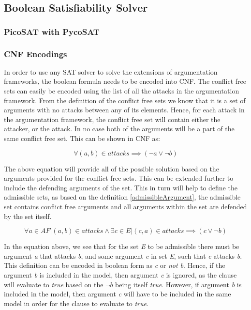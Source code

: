 \subsection{Boolean Satisfiability Solver} \label{section:satSolver}


\subsubsection{PicoSAT with PycoSAT}



\subsubsection{CNF Encodings}
In order to use any SAT solver to solve the extensions of argumentation frameworks, the boolean formula needs to be encoded into CNF. The conflict free sets can easily be encoded using the list of all the attacks in the argumentation framework. From the definition of the conflict free sets we know that it is a set of arguments with no attacks between any of its elements. Hence, for each attack in the argumentation framework, the conflict free set will contain either the attacker, or the attack. In no case both of the arguments will be a part of the same conflict free set. This can be shown in CNF as:

\begin{equation}
	  \forall (a,b) \in attacks \implies (\neg a \lor \neg b)
\end{equation}

The above equation will provide all of the possible solution based on the arguments provided for the conflict free sets. This can be extended further to include the defending arguments of the set. This in turn will help to define the admissible sets, as based on the definition \ref{admissibleArgument}, the admissible set contains conflict free arguments and all arguments within the set are defended by the set itself.

\begin{equation}
\forall a \in AF | (a,b) \in attacks \land \exists c \in E | (c,a) \in attacks \implies (c \lor \neg b)
\end{equation}

In the equation above, we see that for the set \textit{E} to be admissible there must be argument \textit{a} that attacks \textit{b}, and some argument \textit{c} in set \textit{E}, such that \textit{c} attacks \textit{b}. This definition can be encoded in boolean form as \textit{c} or \textit{not b}. Hence, if the argument \textit{b} is included in the model, then argument \textit{c} is ignored, as the clause will evaluate to \textit{true} based on the $\neg b$ being itself \textit{true}. However, if argument \textit{b} is included in the model, then argument \textit{c} will have to be included in the same model in order for the clause to evaluate to \textit{true}.